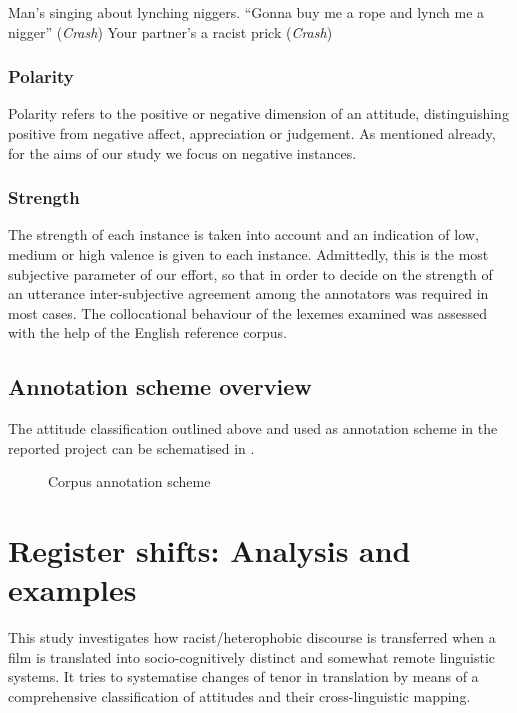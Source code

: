 \documentclass[output=paper]{LSP/langsci}
\begin{document}
\ea \label{ex:2:19} Man's singing about lynching niggers. “Gonna buy me a rope and lynch me a nigger” (\textit{Crash})
\z
\ea \label{ex:2:20} Your partner's a racist prick (\textit{Crash})
\z

\subsubsection{Polarity}
Polarity refers to the positive or negative dimension of an attitude, distinguishing positive from negative affect, appreciation or judgement. As mentioned already, for the aims of our study we focus on negative instances.

\subsubsection{Strength} 
The strength of each instance is taken into account and an indication of low, medium or high valence is given to each instance. Admittedly, this is the most subjective parameter of our effort, so that in order to decide on the strength of an utterance inter-subjective agreement among the annotators was required in most cases. The collocational behaviour of the lexemes examined was assessed with the help of the English reference corpus.

\subsection{Annotation scheme overview} \label{sec:2:4:4}
The attitude classification outlined above and used as annotation scheme in the reported project can be schematised in .

\begin{figure}

\caption{Corpus annotation scheme} \label{fig:2:4} 
\end{figure}

\section{Register shifts: Analysis and examples} \label{sec:2:5}

This study investigates how racist/heterophobic discourse is transferred when a film is translated into socio-cognitively distinct and somewhat remote linguistic systems. It tries to systematise changes of tenor \citep{Halliday1978} in translation by means of a comprehensive classification of attitudes and their cross-linguistic mapping.
\end{document}
